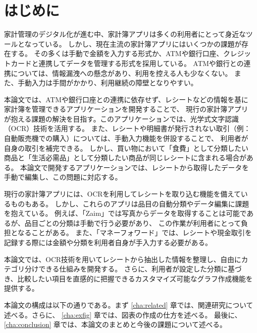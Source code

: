 \documentclass[main]{subfiles}
\begin{document}
\chapter{はじめに}
\label{cha:intro}

家計管理のデジタル化が進む中、家計簿アプリは多くの利用者にとって身近なツールとなっている。
しかし、現在主流の家計簿アプリにはいくつかの課題が存在する。
その多くは手動で金額を入力する形式か、ATMや銀行口座、クレジットカードと連携してデータを管理する形式を採用している。
ATMや銀行との連携については、情報漏洩への懸念があり、利用を控える人も少なくない。
また、手動入力は手間がかかり、利用継続の障壁となりやすい。

本論文では、ATMや銀行口座との連携に依存せず、レシートなどの情報を基に家計簿を管理できるアプリケーションを開発することで、
現行の家計簿アプリが抱える課題の解決を目指す。このアプリケーションでは、光学式文字認識（OCR）技術を活用する。
また、レシートや明細書が発行されない取引（例：自動販売機での購入）については、手動入力機能を併設することで、
利用者が自身の取引を補完できる。
しかし、買い物において「食費」として分類したい商品と「生活必需品」として分類したい商品が同じレシートに含まれる場合がある。
本論文で開発するアプリケーションでは、レシートから取得したデータを手動で編集し、この問題に対応する。

現行の家計簿アプリには、OCRを利用してレシートを取り込む機能を備えているものもある。
しかし、これらのアプリは品目の自動分類やデータ編集に課題を抱えている。
例えば、「Zaim」では写真からデータを取得することは可能であるが、品目ごとの分類は手動で行う必要があり、
この作業が利用者にとって負担となることがある。
また、「マネーフォワード」では、レシートや現金取引を記録する際には金額や分類を利用者自身が手入力する必要がある。

本論文では、OCR技術を用いてレシートから抽出した情報を整理し、自由にカテゴリ分けできる仕組みを開発する。
さらに、利用者が設定した分類に基づき、比較したい項目を直感的に把握できるカスタマイズ可能なグラフ作成機能を提供する。

本論文の構成は以下の通りである。まず \ref{cha:related} 章では、関連研究について述べる。さらに、
\ref{cha:exfig} 章では、図表の作成の仕方を述べる。
最後に、\ref{cha:conclusion} 章では、本論文のまとめと今後の課題について述べる。
\end{document}
